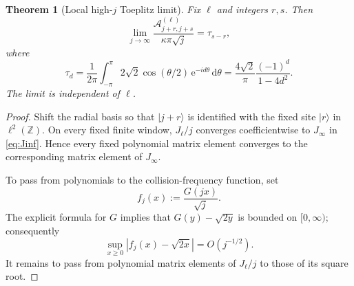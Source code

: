 \documentclass[11pt]{article}
\numberwithin{equation}{section}
\newcommand{\dd}{\,\mathrm d}
\newcommand{\e}{\mathrm e}
\newtheorem{theorem}{Theorem}[section]
\theoremstyle{definition}
\begin{document}
\begin{theorem}[Local high-$j$ Toeplitz limit]
Fix $\ell$ and integers $r,s$.  Then
\begin{equation}
 \boxed{
 \lim_{j\to\infty}
 \frac{
 \mathcal A^{(\ell)}_{j+r,j+s}
 }{\kappa\pi\sqrt j}
 =
 \tau_{s-r},
 }
 \label{eq:Toeplitz_limit}
\end{equation}
where
\begin{equation}
 \tau_d
 =
 \frac1{2\pi}
 \int_{-\pi}^{\pi}
 2\sqrt2\cos(\theta/2)\,
 \e^{-id\theta}\dd\theta
 =
 \frac{4\sqrt2}{\pi}
 \frac{(-1)^d}{1-4d^2}
 .
 \label{eq:tau}
\end{equation}
The limit is independent of $\ell$.
\end{theorem}

\begin{proof}
Shift the radial basis so that $|j+r\rangle$ is identified with the fixed
site $|r\rangle$ in $\ell^2(\mathbb Z)$.  On every fixed finite window,
$J_\ell/j$ converges coefficientwise to $J_\infty$ in
\eqref{eq:Jinf}.  Hence every fixed polynomial matrix element converges to the
corresponding matrix element of $J_\infty$.

To pass from polynomials to the collision-frequency function, set
\begin{equation}
 f_j(x):=\frac{G(jx)}{\sqrt j}.
\end{equation}
The explicit formula for $G$ implies that
$G(y)-\sqrt{2y}$ is bounded on $[0,\infty)$; consequently
\begin{equation}
 \sup_{x\ge0}|f_j(x)-\sqrt{2x}|=O(j^{-1/2}).
 \label{eq:fj_uniform}
\end{equation}
It remains to pass from polynomial matrix elements of $J_\ell/j$ to those of
its square root.


\end{proof}
\end{document}
